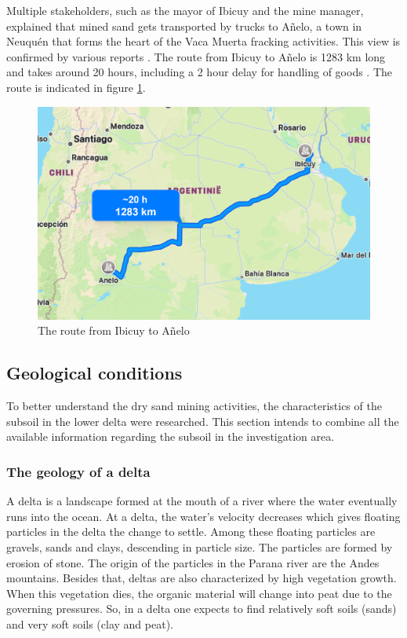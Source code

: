 Multiple stakeholders, such as the mayor of Ibicuy and the mine manager, explained that mined sand gets transported by trucks to Añelo, a town in Neuquén that forms the heart of the Vaca Muerta fracking activities. This view is confirmed by various reports \autocite{cauceArenasParaFracking2022} \autocite{secretariadepoliticamineraArenasParaFracking2019}. The route from Ibicuy to Añelo is 1283 km long and takes around 20 hours, including a 2 hour delay for handling of goods \autocite{secretariadepoliticamineraArenasParaFracking2019}. The route is indicated in figure \ref{fig:sandroute}. 

\begin{figure}[H]
    \centering
    \includegraphics[width=0.6\linewidth]{figures/ch9/Routesand.png}
    \caption{The route from Ibicuy to Añelo}
    \label{fig:sandroute}
\end{figure}

\subsection{Geological conditions} \label{par:geology}
To better understand the dry sand mining activities, the characteristics of the subsoil in the lower delta were researched. This section intends to combine all the available information regarding the subsoil in the investigation area.

\subsubsection{The geology of a delta}
A delta is a landscape formed at the mouth of a river where the water eventually runs into the ocean. At a delta, the water's velocity decreases which gives floating particles in the delta the change to settle. Among these floating particles are gravels, sands and clays, descending in particle size. The particles are formed by erosion of stone. The origin of the particles in the Parana river are the Andes mountains. 
Besides that, deltas are also characterized by high vegetation growth. When this vegetation dies, the organic material will change into peat due to the governing pressures. So, in a delta one expects to find relatively soft soils (sands) and very soft soils (clay and peat).

